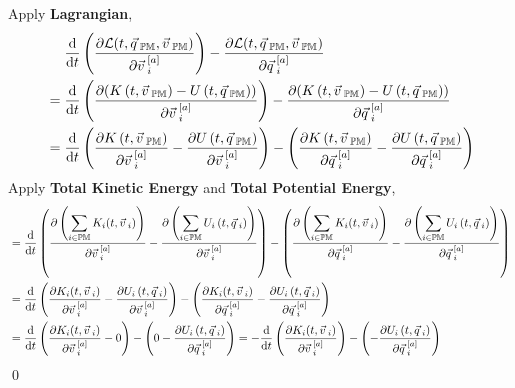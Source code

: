 \documentclass[12pt]{amsart}
\renewenvironment{proof}{{\bfseries Proof.}}{\qed}
\let\oldvec\vec
\renewcommand{\vec}[1]{\oldvec{#1}\hspace{0.1em}}
\begin{document}
\begin{proof}
Apply \textbf{Lagrangian},
\begin{align*}
& \quad \ \dfrac{\mathrm{d}}{\mathrm{d} t} \left ( \dfrac{\partial \mathcal{L} (t, \vec{q}_\mathbb{PM}, \vec{v}_\mathbb{PM})}{\partial \vec{v}^{[a]}_i}  \right ) - \dfrac{\partial \mathcal{L} (t, \vec{q}_\mathbb{PM}, \vec{v}_\mathbb{PM})}{\partial \vec{q}^{[a]}_i}\\
&= \dfrac{\mathrm{d}}{\mathrm{d} t} \left ( \dfrac{\partial (K\left ( t, \vec{v}_\mathbb{PM} \right ) - U\left ( t, \vec{q}_\mathbb{PM} \right ))}{\partial \vec{v}^{[a]}_i}  \right ) - \dfrac{\partial (K\left ( t, \vec{v}_\mathbb{PM} \right )-U\left ( t, \vec{q}_\mathbb{PM} \right ))}{\partial \vec{q}^{[a]}_i} \\
& = \dfrac{\mathrm{d}}{\mathrm{d} t} \left ( \dfrac{\partial K \left ( t, \vec{v}_\mathbb{PM} \right )}{\partial \vec{v}^{[a]}_i} - \dfrac{\partial U\left ( t, \vec{q}_\mathbb{PM} \right )}{\partial \vec{v}^{[a]}_i}  \right ) - \left ( \dfrac{\partial K\left ( t, \vec{v}_\mathbb{PM} \right )}{\partial \vec{q}^{[a]}_i} - \dfrac{\partial U\left ( t, \vec{q}_\mathbb{PM} \right )}{\partial \vec{q}^{[a]}_i} \right )
\end{align*}
Apply \textbf{Total Kinetic Energy} and \textbf{Total Potential Energy},
\begin{align*}
& = \dfrac{\mathrm{d}}{\mathrm{d} t} \left ( \dfrac{\partial \left (\displaystyle \sum_{i \in \mathbb{PM}} K_i (t, \vec{v}_i) \right )}{\partial \vec{v}^{[a]}_i} - \dfrac{\partial \left ( \displaystyle \sum_{i \in \mathbb{PM}} U_i \left ( t, \vec{q}_i \right )\right )}{\partial \vec{v}^{[a]}_i}  \right ) - \left ( \dfrac{\partial \left ( \displaystyle \sum_{i \in \mathbb{PM}} K_i (t, \vec{v}_i) \right )}{\partial \vec{q}^{[a]}_i} - \dfrac{\partial \left ( \displaystyle \sum_{i \in \mathbb{PM}} U_i \left ( t, \vec{q}_i \right ) \right )}{\partial \vec{q}^{[a]}_i} \right )\\
& = \dfrac{\mathrm{d}}{\mathrm{d} t} \left ( \dfrac{\partial K_i (t, \vec{v}_i) }{\partial \vec{v}^{[a]}_i} - \dfrac{\partial U_i \left ( t, \vec{q}_i \right )}{\partial \vec{v}^{[a]}_i}  \right ) - \left ( \dfrac{\partial K_i (t, \vec{v}_i)}{\partial \vec{q}^{[a]}_i} - \dfrac{\partial  U_i \left ( t, \vec{q}_i \right )}{\partial \vec{q}^{[a]}_i} \right )\\
& = \dfrac{\mathrm{d}}{\mathrm{d} t} \left ( \dfrac{\partial K_i (t, \vec{v}_i)}{\partial \vec{v}^{[a]}_i} - 0 \right ) - \left ( 0 - \dfrac{\partial  U_i \left ( t, \vec{q}_i \right )}{\partial \vec{q}^{[a]}_i} \right ) = - \dfrac{\mathrm{d}}{\mathrm{d} t} \left ( \dfrac{\partial K_i (t, \vec{v}_i)}{\partial \vec{v}^{[a]}_i} \right ) - \left ( - \dfrac{\partial  U_i \left ( t, \vec{q}_i \right )}{\partial \vec{q}^{[a]}_i} \right ) \\

\end{align*}
\end{proof}
\end{document}

